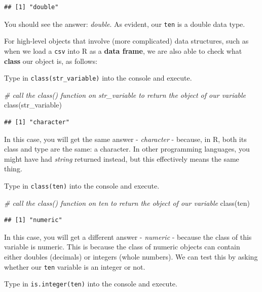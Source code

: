 \documentclass[
]{book}
\newenvironment{Shaded}{\begin{snugshade}}{\end{snugshade}}
\newcommand{\CommentTok}[1]{\textcolor[rgb]{0.56,0.35,0.01}{\textit{#1}}}
\newcommand{\FunctionTok}[1]{\textcolor[rgb]{0.00,0.00,0.00}{#1}}
\newcommand{\NormalTok}[1]{#1}
\begin{document}
\begin{verbatim}
## [1] "double"
\end{verbatim}

You should see the answer: \emph{double}. As evident, our \texttt{ten} is a double data type.

For high-level objects that involve (more complicated) data structures, such as when we load a \texttt{csv} into R as a \textbf{data frame}, we are also able to check what \textbf{class} our object is, as follows:

Type in \texttt{class(str\_variable)} into the console and execute.

\begin{Shaded}
\begin{Highlighting}[]
\CommentTok{\# call the class() function on str\_variable to return the object of our variable}
\FunctionTok{class}\NormalTok{(str\_variable)}
\end{Highlighting}
\end{Shaded}

\begin{verbatim}
## [1] "character"
\end{verbatim}

In this case, you will get the same answer - \emph{character} - because, in R, both its class and type are the same: a character. In other programming languages, you might have had \emph{string} returned instead, but this effectively means the same thing.

Type in \texttt{class(ten)} into the console and execute.

\begin{Shaded}
\begin{Highlighting}[]
\CommentTok{\# call the class() function on ten to return the object of our variable}
\FunctionTok{class}\NormalTok{(ten)}
\end{Highlighting}
\end{Shaded}

\begin{verbatim}
## [1] "numeric"
\end{verbatim}

In this case, you will get a different answer - \emph{numeric} - because the class of this variable is numeric. This is because the class of numeric objects can contain either doubles (decimals) or integers (whole numbers). We can test this by asking whether our \texttt{ten} variable is an integer or not.

Type in \texttt{is.integer(ten)} into the console and execute.
\end{document}

